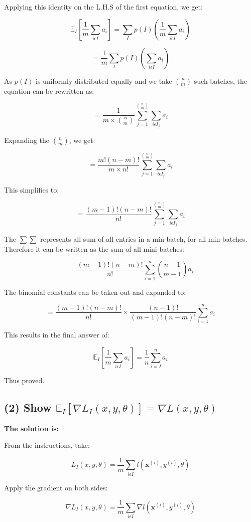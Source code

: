 \documentclass[10pt]{article}
\begin{document}
Applying this identity on the L.H.S of the first equation, we get:

\[
\mathbb{E}_{I}[
\frac{1}{m}
\sum_{i \epsilon I}a_{i}]
=
\sum_{I}p(I)
(
\frac{1}{m}
\sum_{i \epsilon I}a_{i}
)
\]

\[
=
\frac{1}{m}
\sum_{I}p(I)
(
\sum_{i \epsilon I}a_{i}
)
\]

As $p(I)$ is uniformly distributed equally and we take $\binom{n}{m}$ such batches, the equation can be rewritten as: 

\[
=
\frac{1}{m \times \binom{n}{m}}
\sum_{j = 1}^{\binom{n}{m}}
\sum_{i \epsilon I_{j}}a_{i}
\]

Expanding the $\binom{n}{m}$, we get: 

\[
=
\frac{m! (n-m)!}{m \times n!}
\sum_{j = 1}^{\binom{n}{m}}
\sum_{i \epsilon I_{j}}a_{i}
\]

This simplifies to: 

\[
=
\frac{(m-1)! (n-m)!}{n!}
\sum_{j = 1}^{\binom{n}{m}}
\sum_{i \epsilon I_{j}}a_{i}
\]

The $\sum\sum$ represents all sum of all entries in a min-batch, for all min-batches. Therefore it can be written as the sum of all mini-batches:

\[
=
\frac{(m-1)! (n-m)!}{n!}
\sum_{i = 1}^{n} 
\binom{n-1}{m-1}
a_{i}
\]

The binomial constants can be taken out and expanded to: 

\[
=
\frac{(m-1)! (n-m)!}{n!}
\times
\frac{(n-1)!}{(m-1)!(n-m)!}
\sum_{i = 1}^{n} 
a_{i}
\]

This results in the final answer of: 

\[
\mathbb{E}_{I}[
\frac{1}{m}
\sum_{i \epsilon I}a_{i}]
=
\frac{1}{n}
\sum_{i = I}^{n}a_{i}
\]

Thus proved.

\subsection{(2) Show $\mathbb{E}_{I}[\nabla L_{I}(x,y,\theta)] = \nabla L(x,y,\theta)$}

\textbf{The solution is:}

From the instructions, take: 

\[
L_{I}(x,y,\theta) = 
\frac{1}{m}
\sum_{i \epsilon I}
l(\textbf{x}^{(i)},y^{(i)},\theta)
\]

Apply the gradient on both sides:

\[
\nabla L_{I}(x,y,\theta) = 
\frac{1}{m}
\sum_{i \epsilon I}
\nabla l(\textbf{x}^{(i)},y^{(i)},\theta)
\]
\end{document}
